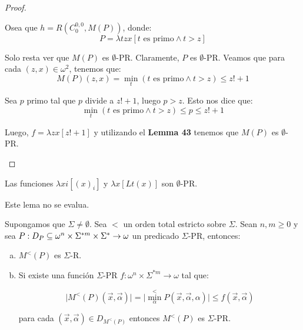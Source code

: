 \begin{proof}
\begin{enumerate}[a)]
        \PN Osea que $h = R \left(C_{0}^{0,0},M(P)\right)$, donde:
        \[
          P = \lambda tzx\left[t \text{ es primo} \wedge t > z\right]
        \]

        \PN Solo resta ver que $M(P)$ es $\emptyset$-PR. Claramente, $P$ es $\emptyset$-PR.
        \PN Veamos que para cada $(z,x) \in \omega^{2}$, tenemos que:
        \[
          M(P)(z,x) = \min_{t}\left(t \text{ es primo} \wedge t > z\right) \leq z! + 1
        \]

        \PN Sea $p$ primo tal que $p$ divide a $z!+1$, luego $p > z$. Esto nos dice que:
        \[
          \min_{t}\left(t \text{ es primo} \wedge t > z\right) \leq p \leq z! + 1
        \]

        \PN Luego, $f = \lambda zx\left[z! + 1\right]$ y utilizando el \textbf{Lemma 43} tenemos que $M(P)$ es
        $\emptyset$-PR.
    \end{enumerate}
  \end{proof}

  \begin{lemma}
    \PN Las funciones $\lambda xi\left[(x)_{i}\right]$ y $\lambda x\left[Lt(x)\right]$ son $\emptyset$-PR.
  \end{lemma}

  \begin{lemma}
    \PN Este lema no se evalua.
  \end{lemma}

  \begin{lemma}
    \PN Supongamos que $\Sigma \neq \emptyset$. Sea $<$ un orden total estricto sobre $\Sigma$. Sean $n, m \geq 0$ y
    sea $P: D_{P} \subseteq \omega^{n} \times \Sigma^{\ast m} \times \Sigma^{\ast} \rightarrow \omega$ un predicado
    $\Sigma$-PR, entonces:

    \begin{enumerate}[a)]
      \item $M^{<}(P)$ es $\Sigma$-R.
      \item Si existe una función $\Sigma$-PR $f: \omega^{n} \times \Sigma^{\ast m} \rightarrow \omega$ tal que:

        \[
          \lvert M^{<}(P)(\vec{x},\vec{\alpha})\rvert = \lvert \min_{\alpha}^{<} P(\vec{x},
          \vec{\alpha},\alpha)\rvert \leq f(\vec{x},\vec{\alpha})
        \]

        \PN para cada $(\vec{x},\vec{\alpha}) \in D_{M^{< }(P)}$ entonces $M^{<}(P)$ es $\Sigma$-PR.
    \end{enumerate}
  \end{lemma}


